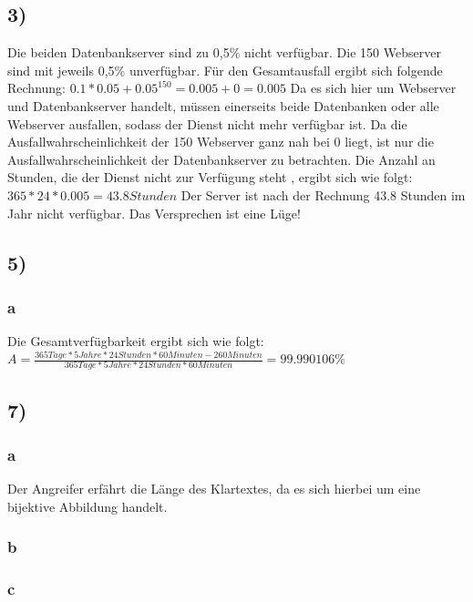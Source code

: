 \documentclass[ngerman]{fbi-aufgabenblatt}
\begin{document}
	\setcounter{section}{0}


	\subsection*{3)}
  Die beiden Datenbankserver sind zu 0,5\% nicht verfügbar. Die 150 Webserver
	sind mit jeweils 0,5\% unverfügbar.
	Für den Gesamtausfall ergibt sich folgende Rechnung: \newline
	$0.1* 0.05 + {0.05}^{150} = 0.005 + 0 = 0.005$ \newline
	Da es sich hier um Webserver und Datenbankserver handelt, müssen einerseits
	beide Datenbanken
	oder alle Webserver ausfallen, sodass der Dienst nicht mehr verfügbar ist.
	Da die Ausfallwahrscheinlichkeit der 150 Webserver ganz nah bei 0 liegt, ist
	nur die Ausfallwahrscheinlichkeit der Datenbankserver zu betrachten.
	\newline
	Die Anzahl an Stunden, die der Dienst nicht zur Verfügung steht , ergibt sich wie folgt: \newline
	$365 * 24 * 0.005 = 43.8 Stunden$ \newline
	Der Server ist nach der Rechnung 43.8 Stunden im Jahr nicht verfügbar.
	Das Versprechen ist eine Lüge!
	
	\subsection*{5)}

  \subsubsection*{a}
  Die Gesamtverfügbarkeit ergibt sich wie folgt: \newline
  \newline
  $A = \frac{365 Tage * 5 Jahre * 24 Stunden * 60 Minuten - 260 Minuten}{365 Tage * 5
  Jahre * 24 Stunden * 60 Minuten}= 99.990106 \%$
  

	
	\subsection*{7)}
  \subsubsection*{a}
  Der Angreifer erfährt die Länge des Klartextes, da es sich hierbei um eine bijektive Abbildung handelt.
    \subsubsection*{b}
      \subsubsection*{c}
\end{document}
